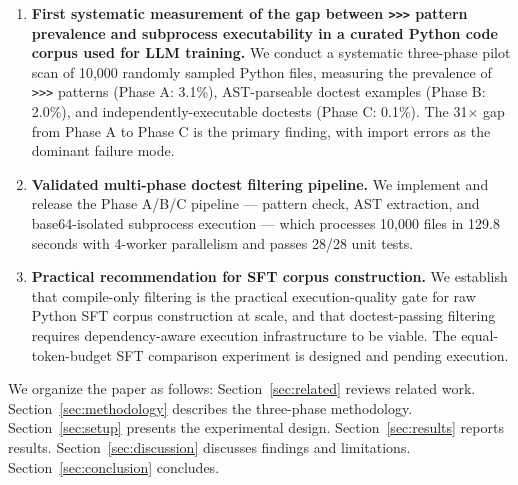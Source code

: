 \begin{enumerate}
\item \textbf{First systematic measurement of the gap between \texttt{>>>} pattern prevalence
and subprocess executability in a curated Python code corpus used for LLM training.}
We conduct a systematic three-phase pilot scan of 10,000 randomly sampled Python files,
measuring the prevalence of \texttt{>>>} patterns (Phase A: 3.1\%), AST-parseable doctest
examples (Phase B: 2.0\%), and independently-executable doctests (Phase C: 0.1\%). The
31$\times$ gap from Phase A to Phase C is the primary finding, with import errors as the
dominant failure mode.

\item \textbf{Validated multi-phase doctest filtering pipeline.}
We implement and release the Phase A/B/C pipeline --- pattern check, AST extraction,
and base64-isolated subprocess execution --- which processes 10,000 files in 129.8 seconds
with 4-worker parallelism and passes 28/28 unit tests.

\item \textbf{Practical recommendation for SFT corpus construction.}
We establish that compile-only filtering is the practical execution-quality gate for
raw Python SFT corpus construction at scale, and that doctest-passing filtering requires
dependency-aware execution infrastructure to be viable. The equal-token-budget SFT
comparison experiment is designed and pending execution.
\end{enumerate}

We organize the paper as follows: Section~\ref{sec:related} reviews related work.
Section~\ref{sec:methodology} describes the three-phase methodology. Section~\ref{sec:setup}
presents the experimental design. Section~\ref{sec:results} reports results.
Section~\ref{sec:discussion} discusses findings and limitations. Section~\ref{sec:conclusion}
concludes.
